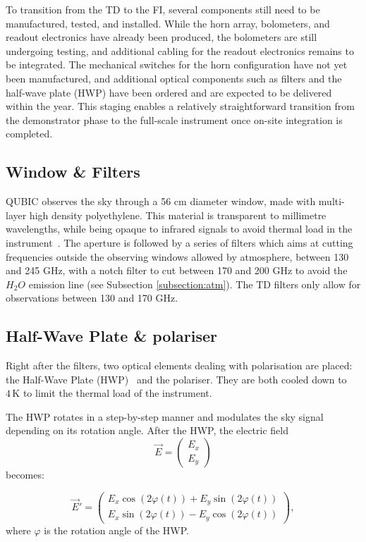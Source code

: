 \documentclass[../../thesis.tex]{subfiles}
\begin{document}
To transition from the TD to the FI, several components still need to be manufactured, tested, and installed. While the horn array, bolometers, and readout electronics have already been produced, the bolometers are still undergoing testing, and additional cabling for the readout electronics remains to be integrated. The mechanical switches for the horn configuration have not yet been manufactured, and additional optical components such as filters and the half-wave plate (HWP) have been ordered and are expected to be delivered within the year. This staging enables a relatively straightforward transition from the demonstrator phase to the full-scale instrument once on-site integration is completed.

\subsection{Window \& Filters}

QUBIC observes the sky through a 56 cm diameter window, made with multi-layer high density polyethylene. This material is transparent to millimetre wavelengths, while being opaque to infrared signals to avoid thermal load in the instrument~\cite{Choi_2013}. The aperture is followed by a series of filters which aims at cutting frequencies outside the observing windows allowed by atmosphere, between 130 and 245 GHz, with a notch filter to cut between 170 and 200 GHz to avoid the $H_2O$ emission line (see Subsection \ref{subsection:atm}). The TD filters only allow for observations between 130 and 170 GHz.

\subsection{Half-Wave Plate \& polariser} \label{sub:polariser}

Right after the filters, two optical elements dealing with polarisation are placed: the Half-Wave Plate (HWP)~\cite{QUBICVI} and the polariser. They are both cooled down to $4\,\mathrm{K}$ to limit the thermal load of the instrument.

The HWP rotates in a step-by-step manner and modulates the sky signal depending on its rotation angle. After the HWP, the electric field
\[
\vec{E} =
\begin{pmatrix}
E_x \\
E_y
\end{pmatrix}
\]
becomes:

\begin{equation}
    \vec{E}' =
    \begin{pmatrix}
        E_x \cos(2\varphi(t)) + E_y \sin(2\varphi(t)) \\
        E_x \sin(2\varphi(t)) - E_y \cos(2\varphi(t))
    \end{pmatrix},
\end{equation}
where $\varphi$ is the rotation angle of the HWP.
\end{document}
